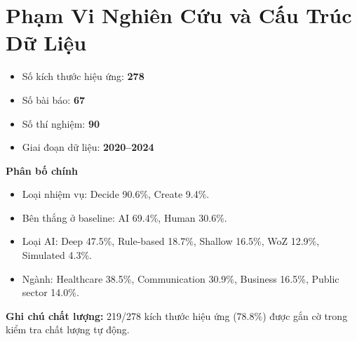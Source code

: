 \section*{Phạm Vi Nghiên Cứu và Cấu Trúc Dữ Liệu}
\begin{itemize}[leftmargin=1.2em]
  \item Số kích thước hiệu ứng: \textbf{278}
  \item Số bài báo: \textbf{67}
  \item Số thí nghiệm: \textbf{90}
  \item Giai đoạn dữ liệu: \textbf{2020--2024}
\end{itemize}

\noindent\textbf{Phân bố chính}
\begin{itemize}[leftmargin=1.2em]
  \item Loại nhiệm vụ: Decide 90.6\%, Create 9.4\%.
  \item Bên thắng ở baseline: AI 69.4\%, Human 30.6\%.
  \item Loại AI: Deep 47.5\%, Rule-based 18.7\%, Shallow 16.5\%, WoZ 12.9\%, Simulated 4.3\%.
  \item Ngành: Healthcare 38.5\%, Communication 30.9\%, Business 16.5\%, Public sector 14.0\%.
\end{itemize}

\noindent\textbf{Ghi chú chất lượng:} 219/278 kích thước hiệu ứng (78.8\%) được gắn cờ trong kiểm tra chất lượng tự động.
